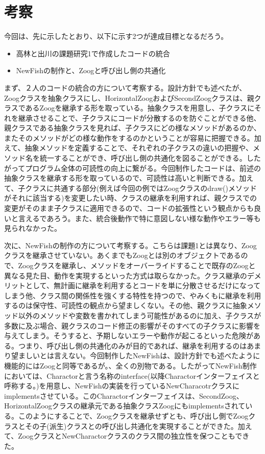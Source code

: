 \documentclass[dvipdfmx]{jsarticle}
\begin{document}
\section{考察}
今回は、先に示したとおり、以下に示す2つが達成目標となるだろう。
\begin{itemize}
  \item 高林と出川の課題研究1で作成したコードの統合
  \item NewFishの制作と、Zoogと呼び出し側の共通化
\end{itemize}
まず、２人のコードの統合の方について考察する。設計方針でも述べたが、Zoogクラスを抽象クラスにし、HorizontalZoogおよびSecondZoogクラスは、親クラスであるZoogを継承する形を取っている。抽象クラスを用意し、子クラスにそれを継承させることで、子クラスにコードが分散するのを防ぐことができる他、親クラスである抽象クラスを見れば、子クラスにどの様なメソッドがあるのか、またそのメソッドがどの様な動作をするのかということが容易に把握できる。加えて、抽象メソッドを定義することで、それぞれの子クラスの違いの把握や、メソッド名を統一することができ、呼び出し側の共通化を図ることができる。したがってプログラム全体の可読性の向上に繋がる。今回制作したコードは、前述の抽象クラスを継承する形を取っているので、可読性は高いと判断できる。加えて、子クラスに共通する部分(例えば今回の例ではZoogクラスのdraw()メソッドがそれに該当する)を変更したい時、クラスの継承を利用すれば、親クラスでの変更がそのまま子クラスに適用できるので、コードの拡張性という観点からも良いと言えるであろう。また、統合後動作で特に意図しない様な動作やエラー等も見られなかった。\par
次に、NewFishの制作の方について考察する。こちらは課題1とは異なり、Zoogクラスを継承させていない。あくまでもZoogとは別のオブジェクトであるので、Zoogクラスを継承し、メソッドをオーバーライドすることで既存のZoogと異なる見た目、動作を実現するといった方式は取らなかった。クラス継承のデメリットとして、無計画に継承を利用するとコードを単に分散させるだけになってしまう他、クラス間の関係性を強くする特性を持つので、やみくもに継承を利用するのは保守性、可読性の観点から望ましくない。その他、親クラスに抽象メソッド以外のメソッドや変数を書かれてしまう可能性があるのに加え、子クラスが多数に及ぶ場合、親クラスのコード修正の影響がそのすべての子クラスに影響を与えてしまう。そうすると、予期しないエラーや動作が起こるといった危険がある。つまり、呼び出し側の共通化のみが目的であれば、継承を利用するのはあまり望ましいとは言えない。今回制作したNewFishは、設計方針でも述べたように機能的にはZoogと同等であるが。、全くの別物である。したがってNewFish制作においては、Charactorと言う名称のinterface(以降Charactorインターフェイスと呼称する。)を用意し、NewFishの実装を行っているNewCharacotrクラスにimplementsさせている。このCharactorインターフェイスは、SecondZoog、HorizontalZoogクラスの継承元である抽象クラスZoogにもimplementsされている。このようにすることで、Zoogクラスを継承せずとも、呼び出し側でZoogクラスとその子(派生)クラスとの呼び出し共通化を実現することができた。加えて、ZoogクラスとNewCharactorクラスのクラス間の独立性を保つこともできた。\par
\end{document}
